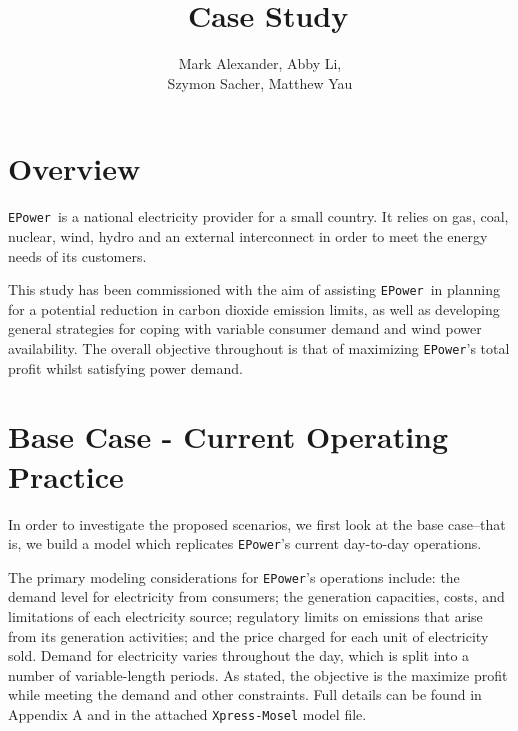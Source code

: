 \documentclass{article}
\title{\Huge \EPower\ Case Study}
\author{Mark Alexander, Abby Li,\\[0.2cm]Szymon Sacher, Matthew Yau}
\newcommand{\EPower}{\texttt{EPower}}
\begin{document}
	\begin{titlepage}

	\maketitle
    
    \end{titlepage}
    
    
    \section{Overview}
    
    \EPower\ is a national electricity provider for a small country.  It relies on gas, coal, nuclear, wind, hydro and an external interconnect in order to meet the energy needs of its customers.
    
    This study has been commissioned with the aim of assisting \EPower\ in planning for a potential reduction in carbon dioxide emission limits, as well as developing general strategies for coping with variable consumer demand and wind power availability.  The overall objective throughout is that of maximizing \EPower's total profit whilst satisfying power demand.
    
    
    
    \section{Base Case - Current Operating Practice}
	
    In order to investigate the proposed scenarios, we first look at the base case--that is, we build a model which replicates \EPower's current day-to-day operations.
    
    The primary modeling considerations for \EPower's operations include: the demand level for electricity from consumers; the generation capacities, costs, and limitations of each electricity source; regulatory limits on emissions that arise from its generation activities; and the price charged for each unit of electricity sold.  Demand for electricity varies throughout the day, which is split into a number of variable-length periods.  As stated, the objective is the maximize profit while meeting the demand and other constraints. Full details can be found in Appendix A and in the attached \texttt{Xpress-Mosel} model file.
    
\end{document}

